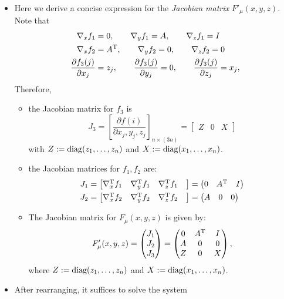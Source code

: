 \begin{itemize}
\item
Here we derive a concise expression for the \emph{Jacobian matrix} $F'_\mu(x,y,z)$. Note that
\begin{align*}
\nabla_x f_1&=0,\qquad
\nabla_yf_1=A,\qquad
\nabla_zf_1=I\\
\nabla_x f_2&=A^{\mathrm T},\qquad
\nabla_yf_2=0,\qquad
\nabla_zf_2=0\\
\frac{\partial f_3(j)}{\partial x_j}&=z_j,\qquad
\frac{\partial f_3(j)}{\partial y_j}=0,\qquad
\frac{\partial f_3(j)}{\partial z_j}=x_j,
\end{align*}
Therefore, 
\begin{itemize}
\item
the Jacobian matrix for $f_3$ is 
\[
J_3=[\frac{\partial f(i)}{\partial x_j,y_j,z_j}]_{n\times(3n)}=
\begin{bmatrix}
Z&0&X
\end{bmatrix}
\]
with $Z:=\operatorname{diag}(z_1,\dots,z_n)$ and $X:=\operatorname{diag}(x_1,\dots,x_n)$.
\item
the Jacobian matrices for $f_1,f_2$ are:
\begin{align*}
J_1&=\begin{bmatrix}
\nabla_x^{\mathrm T} f_1&
\nabla_y^{\mathrm T} f_1&
\nabla_z^{\mathrm T} f_1&
\end{bmatrix}=\begin{pmatrix}
0&A^{\mathrm T}&I
\end{pmatrix}
\\
J_2&=\begin{bmatrix}
\nabla_x^{\mathrm T} f_2&
\nabla_y^{\mathrm T} f_2&
\nabla_z^{\mathrm T} f_2&
\end{bmatrix}=\begin{pmatrix}
A&0&0
\end{pmatrix}
\end{align*}
\item
The Jacobian matrix for $F_\mu(x,y,z)$ is given by:
\[
F'_\mu(x,y,z)=
\begin{pmatrix}
J_1\\J_2\\J_3
\end{pmatrix}=
\begin{pmatrix}
0&A^{\mathrm T}&I\\A&0&0\\Z&0&X
\end{pmatrix},
\]
where $Z:=\operatorname{diag}(z_1,\dots,z_n)$ and $X:=\operatorname{diag}(x_1,\dots,x_n)$.
\end{itemize}
\item
After rearranging, it suffices to solve the system

\end{itemize}

